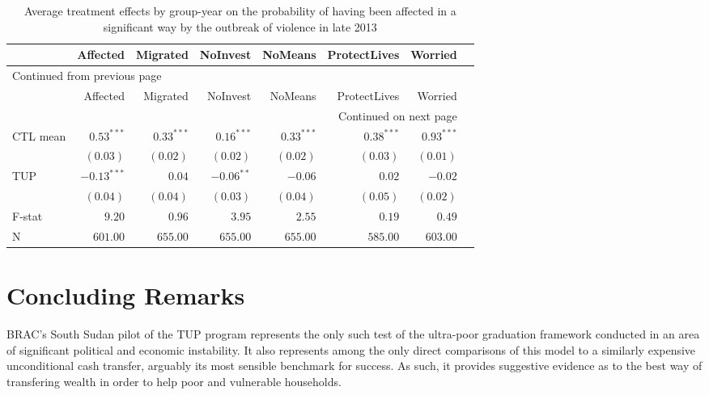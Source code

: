 \documentclass[12pt,article]{article}
\begin{document}
\begin{longtable}{lrrrrrrr}
\caption{\label{tab:orgtable8}
Average treatment effects by group-year on the probability of having been affected in a significant way by the outbreak of violence in late 2013}
\\
\hline
 & Affected & Migrated & NoInvest & NoMeans & ProtectLives & Worried\\
\hline
\endfirsthead
\multicolumn{7}{l}{Continued from previous page} \\
\hline

 & Affected & Migrated & NoInvest & NoMeans & ProtectLives & Worried \\

\hline
\endhead
\hline\multicolumn{7}{r}{Continued on next page} \\
\endfoot
\endlastfoot
\hline
CTL mean & \(0.53^{***}\) & \(0.33^{***}\) & \(0.16^{***}\) & \(0.33^{***}\) & \(0.38^{***}\) & \(0.93^{***}\)\\
 & \(( 0.03)\) & \(( 0.02)\) & \(( 0.02)\) & \(( 0.02)\) & \(( 0.03)\) & \(( 0.01)\)\\
TUP & \(-0.13^{***}\) & \(0.04\) & \(-0.06^{**}\) & \(-0.06\) & \(0.02\) & \(-0.02\)\\
 & \(( 0.04)\) & \(( 0.04)\) & \(( 0.03)\) & \(( 0.04)\) & \(( 0.05)\) & \(( 0.02)\)\\
\hline
F-stat & \(9.20\) & \(0.96\) & \(3.95\) & \(2.55\) & \(0.19\) & \(0.49\)\\
N & \(601.00\) & \(655.00\) & \(655.00\) & \(655.00\) & \(585.00\) & \(603.00\)\\
\hline
\end{longtable}

\newpage
\section{Concluding Remarks}
\label{sec:orgheadline17}

BRAC's South Sudan pilot of the TUP program represents the only such test of the
ultra-poor graduation framework conducted in an area of significant political and
economic instability. It also represents among the only direct comparisons of this
model to a similarly expensive unconditional cash transfer, arguably its most
sensible benchmark for success. As such, it provides suggestive evidence as to the
best way of transfering wealth in order to help poor and vulnerable households.
\end{document}
